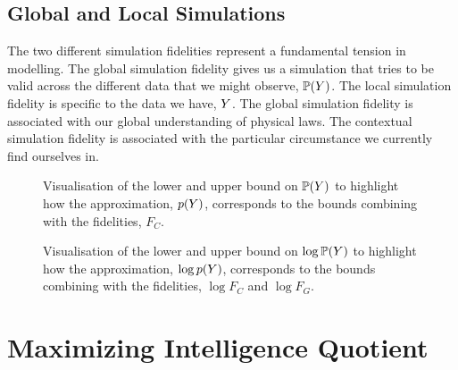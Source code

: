 \documentclass[]{article}
\begin{document}
\subsection{Global and Local Simulations}

The two different simulation fidelities represent a fundamental
tension in modelling. The global simulation fidelity gives us a
simulation that tries to be valid across the different data that we
might observe, $\mathbb{P}(Y)$. The local simulation
fidelity is specific to the data we have, $Y$. The global
simulation fidelity is associated with our global understanding of
physical laws. The contextual simulation fidelity is associated with
the particular circumstance we currently find ourselves in.



\begin{figure}
    \centering
    \def\svgwidth{\textwidth}
   
    \caption{Visualisation of the lower and upper bound on
      $\mathbb{P}(Y)$ to highlight how the approximation,
      $p(Y)$, corresponds to the bounds
      combining with the fidelities, $F_C$.}
    \label{fig-py-bounds}
\end{figure}



\begin{figure}
  \centering
  \def\svgwidth{\textwidth}
    
    \caption{Visualisation of the lower and upper bound on $\log
      \mathbb{P}(Y)$ to highlight how the approximation,
      $\log p(Y)$, corresponds to the bounds
      combining with the fidelities, $\log F_C$ and $\log F_G$.}
    \label{fig-log-py-bounds}
\end{figure}


\section{Maximizing Intelligence Quotient}
\end{document}
